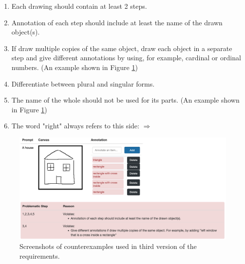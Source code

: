 \begin{enumerate}
\item Each drawing should contain at least 2 steps.
\item Annotation of each step should include at least the name of the drawn object(s).
\item If draw multiple copies of the same object, draw each object in a separate step and give different annotations by using, for example, cardinal or ordinal numbers. (An example shown in Figure \ref{v1.requirement_3})
\item Differentiate between plural and singular forms.
\item The name of the whole should not be used for its parts. (An example shown in Figure \ref{v1.requirement_3})
\item The word "right" always refers to this side: $\Longrightarrow$
\end{enumerate}

\begin{figure}[!htb]
\includegraphics[width=.8\linewidth]{data_collection/v1_requirement3_bad1.png}  
\caption{Screenshots of counterexamples used in third version of the requirements.}
\label{v1.requirement_3}
\end{figure}




